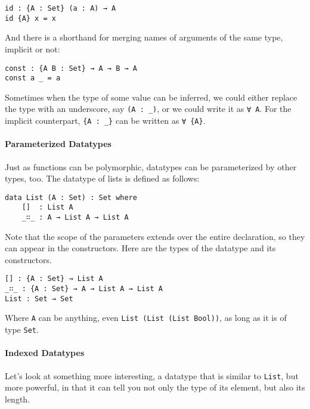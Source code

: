 \documentclass[12pt, a4paper]{article}
\begin{document}
\begin{lstlisting}
id : {A : Set} (a : A) → A
id {A} x = x
\end{lstlisting}

And there is a shorthand for merging names of arguments of the same type, implicit or not:

\begin{lstlisting}
const : {A B : Set} → A → B → A
const a _ = a
\end{lstlisting}

Sometimes when the type of some value can be inferred, we could either replace
the type with an underscore, say {\lstinline|(A : _)|}, or we could write it as
{\lstinline|∀ A|}. For the implicit counterpart, {\lstinline|{A : _}|} can be
written as {\lstinline|∀ {A}|}.

\paragraph{Parameterized Datatypes}

Just as functions can be polymorphic, datatypes can be parameterized by other
types, too. The datatype of lists is defined as follows:

\begin{lstlisting}
data List (A : Set) : Set where
    []  : List A
    _∷_ : A → List A → List A
\end{lstlisting}

Note that the scope of the parameters extends over the entire declaration, so
they can appear in the constructors.
Here are the types of the datatype and its constructors.

\begin{lstlisting}
[] : {A : Set} → List A
_∷_ : {A : Set} → A → List A → List A
List : Set → Set
\end{lstlisting}

Where {\lstinline|A|} can be anything, even {\lstinline|List (List (List Bool))|},
as long as it is of type {\lstinline|Set|}.

\paragraph{Indexed Datatypes}


Let's look at something more interesting, a datatype that is similar to
{\lstinline|List|}, but more powerful, in that it can tell you not only the type
of its element, but also its length.
\end{document}
